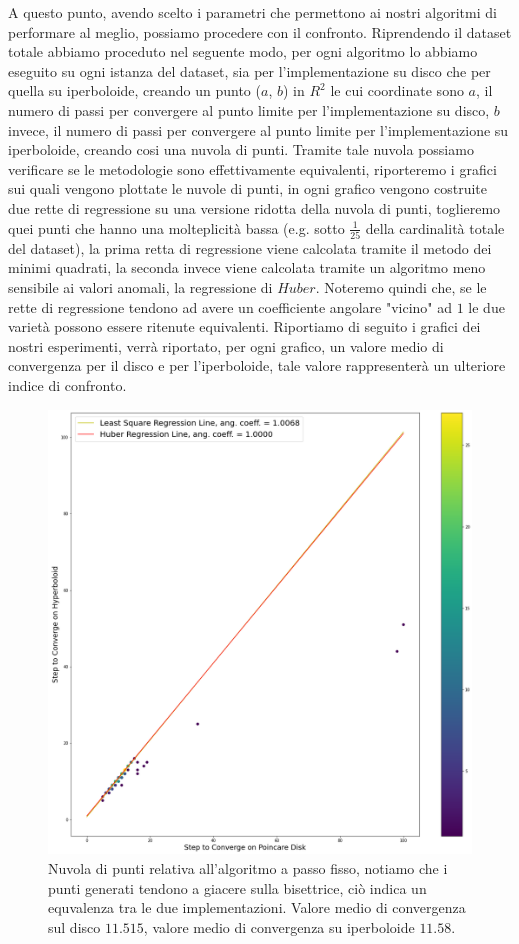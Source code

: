 \documentclass[a4paper, 12pt]{article}
\begin{document}
A questo punto, avendo scelto i parametri che permettono ai nostri algoritmi di performare al meglio, possiamo procedere con il confronto. Riprendendo il dataset totale abbiamo proceduto nel seguente modo, per ogni algoritmo lo abbiamo eseguito su ogni istanza del dataset, sia per l'implementazione su disco che per quella su iperboloide, creando un punto  ($a$, $b$) in $R^2$ le cui coordinate sono $a$, il numero di passi per convergere al punto limite per l'implementazione su disco, $b$ invece, il numero di passi per convergere al punto limite per l'implementazione su iperboloide, creando cosi una nuvola di punti. Tramite tale nuvola possiamo verificare se le metodologie sono effettivamente equivalenti, riporteremo i grafici sui quali vengono plottate le nuvole di punti, in ogni grafico vengono costruite due rette di regressione su una versione ridotta della nuvola di punti, toglieremo quei punti che hanno una molteplicità bassa (e.g. sotto $\frac{1}{25}$ della cardinalità totale del dataset), la prima retta di regressione viene calcolata tramite il metodo dei minimi quadrati, la seconda invece viene calcolata tramite un algoritmo meno sensibile ai valori anomali, la regressione di $Huber$. Noteremo quindi che, se le rette di regressione tendono ad avere un coefficiente angolare "vicino" ad $1$ le due varietà possono essere ritenute equivalenti.  Riportiamo di seguito i grafici dei nostri esperimenti, verrà riportato, per ogni grafico, un valore medio di convergenza per il disco e per l'iperboloide, tale valore rappresenterà un ulteriore indice di confronto.\\
\begin{figure}[t] %
    \centering\includegraphics[width=1\textwidth]{fixed_step_size.png}
    \caption{Nuvola di punti relativa all'algoritmo a passo fisso, notiamo che i punti generati tendono a giacere sulla bisettrice, ciò indica un equvalenza tra le due implementazioni. Valore medio di convergenza sul disco $11.515$, valore medio di convergenza su iperboloide $11.58$.}
\end{figure}
\end{document}
